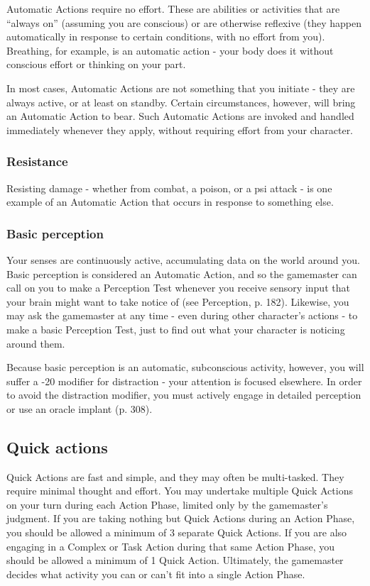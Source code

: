 Automatic Actions require no effort. These are abilities or activities that are ``always on'' (assuming you are conscious) or are otherwise reflexive (they happen automatically in response to certain conditions, with no effort from you). Breathing, for example, is an automatic action - your body does it without conscious effort or thinking on your part.

In most cases, Automatic Actions are not something that you initiate - they are always active, or at least on standby. Certain circumstances, however, will bring an Automatic Action to bear. Such Automatic Actions are invoked and handled immediately whenever they apply, without requiring effort from your character.

\subsubsection{Resistance} Resisting damage - whether from combat, a poison, or a psi attack - is one example of an Automatic Action that occurs in response to something else.

\subsubsection{Basic perception} Your senses are continuously active, accumulating data on the world around you. Basic perception is considered an Automatic Action, and so the gamemaster can call on you to make a Perception Test whenever you receive sensory input that your brain might want to take notice of (see Perception, p. 182). Likewise, you may ask the gamemaster at any time - even during other character’s actions - to make a basic Perception Test, just to find out what your character is noticing around them.

Because basic perception is an automatic, subconscious activity, however, you will suffer a -20 modifier for distraction - your attention is focused elsewhere. In order to avoid the distraction modifier, you must actively engage in detailed perception or use an oracle implant (p. 308).


\subsection{Quick actions}
\label{sec:combat-quick-actions}

Quick Actions are fast and simple, and they may often be multi-tasked. They require minimal thought and effort. You may undertake multiple Quick Actions on your turn during each Action Phase, limited only by the gamemaster’s judgment. If you are taking nothing but Quick Actions during an Action Phase, you should be allowed a minimum of 3 separate Quick Actions. If you are also engaging in a Complex or Task Action during that same Action Phase, you should be allowed a minimum of 1 Quick Action. Ultimately, the gamemaster decides what activity you can or can’t fit into a single Action Phase.


